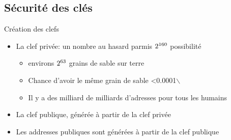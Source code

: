 \documentclass[presentation]{beamer}
\begin{document}
\subsection{Sécurité des clés}
\label{sec:orgef3aaac}

\begin{frame}[label={sec:org69f860f}]{Création des clefs}
\begin{itemize}
\item La clef privée: un nombre au hasard parmis \(2\textsuperscript{160}\) possibilité
\begin{itemize}
\item environs \(2\textsuperscript{63}\) grains de sable sur terre
\item Chance d'avoir le même grain de sable <0.0001$\backslash$%
\item Il y a des milliard de milliards d'adresses pour tous les humains
\end{itemize}
\item La clef publique, générée à partir de la clef privée
\item Les addresses publiques sont générées à partir de la clef publique
\end{itemize}
\end{frame}
\end{document}
